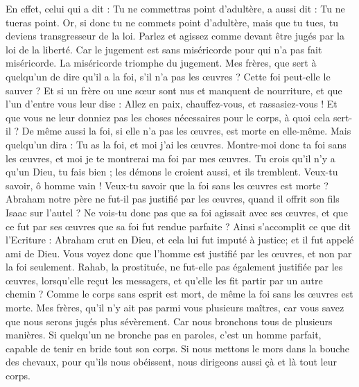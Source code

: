 \begin{multicols}{2}
En effet, celui qui a dit : Tu ne commettras point d’adultère, a aussi dit : Tu ne tueras point. Or, si donc tu ne commets point d’adultère{}, mais que tu tues, tu deviens transgresseur de la loi.
Parlez et agissez comme devant être jugés par la loi de la liberté.
Car le jugement est sans miséricorde pour qui n’a pas fait miséricorde{}. La miséricorde triomphe du jugement.
Mes frères, que sert à quelqu'un de dire qu'il a la foi, s’il n’a pas les œuvres ? Cette foi peut-elle le sauver ?
Et si un frère ou une sœur sont nus et manquent de nourriture,
et que l’un d'entre vous leur dise : Allez en paix, chauffez-vous, et rassasiez-vous ! Et que vous ne leur donniez pas les choses nécessaires pour le corps, à quoi cela sert-il ?
De même aussi la foi, si elle n'a pas les œuvres, est morte en elle-même.
Mais quelqu'un dira : Tu as la foi, et moi j'ai les œuvres. Montre-moi donc ta foi sans les œuvres, et moi je te montrerai ma foi par mes œuvres.
Tu crois qu'il n'y a qu'un Dieu, tu fais bien ; les démons le croient aussi, et ils tremblent.
Veux-tu savoir, ô homme vain ! Veux-tu savoir que la foi sans les œuvres est morte ?
Abraham notre père ne fut-il pas justifié par les œuvres, quand il offrit son fils Isaac sur l'autel ?
Ne vois-tu donc pas que sa foi agissait avec ses œuvres, et que ce fut par ses œuvres que sa foi fut rendue parfaite ?
Ainsi s’accomplit ce que dit l’Ecriture : Abraham crut en Dieu, et cela lui fut imputé à justice{}; et il fut appelé ami de Dieu.
Vous voyez donc que l'homme est justifié par les œuvres, et non par la foi seulement.
Rahab, la prostituée, ne fut-elle pas également justifiée par les œuvres, lorsqu’elle reçut les messagers, et qu'elle les fit partir par un autre chemin{} ?
Comme le corps sans esprit est mort, de même la foi sans les œuvres est morte.
\VerseOne{}Mes frères, qu’il n’y ait pas parmi vous plusieurs maîtres{}, car vous savez que nous serons jugés plus sévèrement.
Car nous bronchons tous de plusieurs manières. Si quelqu'un ne bronche pas en paroles, c’est un homme parfait, capable de tenir en bride tout son corps.
Si nous mettons le mors dans la bouche des chevaux, pour qu'ils nous obéissent, nous dirigeons aussi çà et là tout leur corps.

\end{multicols}
